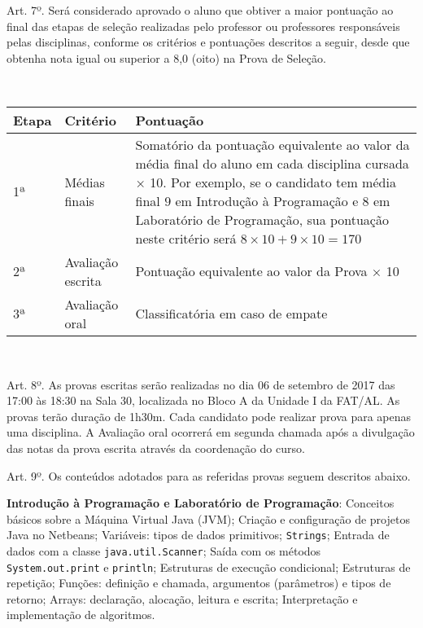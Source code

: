 \documentclass[10pt, oneside]{memoir}
\begin{document}
{	Art. 7º. Será considerado aprovado o aluno que obtiver a maior pontuação ao final das etapas de seleção realizadas pelo professor ou professores responsáveis pelas disciplinas, conforme os critérios e pontuações descritos a seguir, desde que obtenha nota igual ou superior a 8,0 (oito) na Prova de Seleção.
	
	~
	
	\begin{tabu} to \textwidth {X[.1l]X[.25l]X[j]}
		Etapa&Critério&Pontuação\\
		\midrule
		1ª&Médias finais&{Somatório da pontuação equivalente ao valor da média final do aluno em cada disciplina cursada × 10. Por exemplo, se o candidato tem média final $9$ em Introdução à Programação e $8$ em Laboratório de Programação, sua pontuação neste critério será $8 \times 10 + 9 \times 10 = 170$}\\
		\midrule
		2ª&Avaliação escrita&Pontuação equivalente ao valor da Prova × 10\\
		\midrule
		3ª&Avaliação oral&Classificatória em caso de empate\\
		\bottomrule
	\end{tabu}
	
	~
	
	Art. 8º. As provas escritas serão realizadas no dia 06 de setembro de 2017 das 17:00 às 18:30 na Sala 30, localizada no Bloco A da Unidade I da FAT/AL. As provas terão duração de 1h30m. Cada candidato pode realizar prova para apenas uma disciplina. A Avaliação oral ocorrerá em segunda chamada após a divulgação das notas da prova escrita através da coordenação do curso.
	
	Art. 9º. Os conteúdos adotados para as referidas provas seguem descritos abaixo.
}

\textbf{Introdução à Programação e Laboratório de Programação}:
Conceitos básicos sobre a Máquina Virtual Java (JVM); Criação e configuração de projetos Java no Netbeans; Variáveis: tipos de dados primitivos; \texttt{Strings}; Entrada de dados com a classe \texttt{java.util.Scanner}; Saída com os métodos \texttt{System.out.print} e \texttt{println}; Estruturas de execução condicional; Estruturas de repetição; Funções: definição e chamada, argumentos (parâmetros) e tipos de retorno; Arrays: declaração, alocação, leitura e escrita; Interpretação e implementação de algoritmos.
\end{document}
